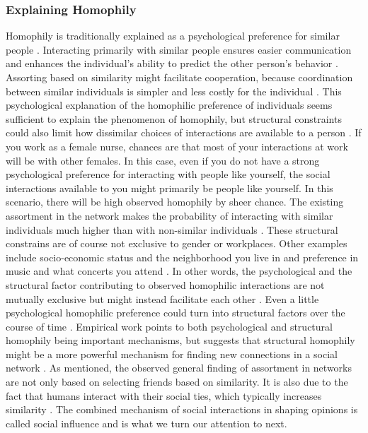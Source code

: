 \documentclass{article}
\begin{document}
\subsubsection{Explaining Homophily}
Homophily is traditionally explained as a psychological preference for similar people \cite{asikainen_cumulative_2020,mcpherson_birds_2001,winter_you_2020}. Interacting primarily with similar people ensures easier communication and enhances the individual’s ability to predict the other person’s behavior \cite{kossinets_origins_2009,winter_you_2020}. Assorting based on similarity might facilitate cooperation, because coordination between similar individuals is simpler and less costly for the individual \cite{winter_you_2020,carter2015phenotypic}. This psychological explanation of the homophilic preference of individuals seems sufficient to explain the phenomenon of homophily, but structural constraints could also limit how dissimilar choices of interactions are available to a person \cite{peixoto_disentangling_2022}. If you work as a female nurse, chances are that most of your interactions at work will be with other females. In this case, even if you do not have a strong psychological preference for interacting with people like yourself, the social interactions available to you might primarily be people like yourself. In this scenario, there will be high observed homophily by sheer chance. The existing assortment in the network makes the probability of interacting with similar individuals much higher than with non-similar individuals \cite{peixoto_disentangling_2022}. These structural constrains are of course not exclusive to gender or workplaces. Other examples include socio-economic status and the neighborhood you live in and preference in music and what concerts you attend \cite{mcpherson_birds_2001}. In other words, the psychological and the structural factor contributing to observed homophilic interactions are not mutually exclusive but might instead facilitate each other \cite{asikainen_cumulative_2020}. Even a little psychological homophilic preference could turn into structural factors over the course of time \cite{asikainen_cumulative_2020,kossinets_origins_2009,taylor_exploring_2018}. Empirical work points to both psychological and structural homophily being important mechanisms, but suggests that structural homophily might be a more powerful mechanism for finding new connections in a social network \cite{bener_empirical_2016,kossinets_origins_2009}.
As mentioned, the observed general finding of assortment in networks are not only based on selecting friends based on similarity. It is also due to the fact that humans interact with their social ties, which typically increases similarity \cite{friedkin_social_1990,spears_social_2021}. The combined mechanism of social interactions in shaping opinions is called social influence and is what we turn our attention to next. 
\end{document}
